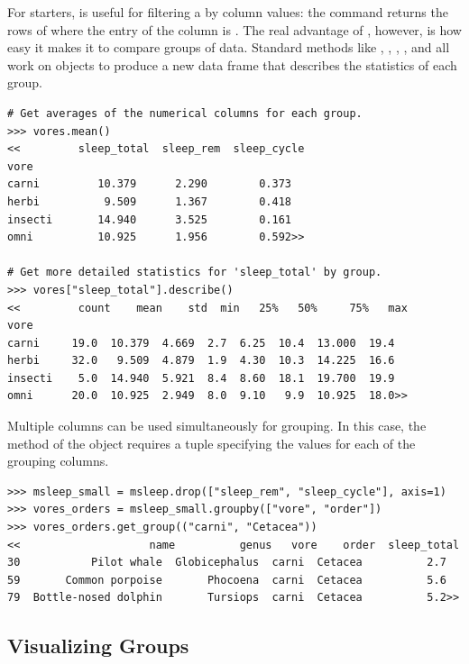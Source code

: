 For starters,  is useful for filtering a  by column values:
the command  returns the rows of  where the entry of the  column is .
The real advantage of , however, is how easy it makes it to compare groups of data.
Standard  methods like , , , , and  all work on  objects to produce a new data frame that describes the statistics of each group.

\begin{lstlisting}
# Get averages of the numerical columns for each group.
>>> vores.mean()
<<         sleep_total  sleep_rem  sleep_cycle
vore
carni         10.379      2.290        0.373
herbi          9.509      1.367        0.418
insecti       14.940      3.525        0.161
omni          10.925      1.956        0.592>>

# Get more detailed statistics for 'sleep_total' by group.
>>> vores["sleep_total"].describe()
<<         count    mean    std  min   25%   50%     75%   max
vore
carni     19.0  10.379  4.669  2.7  6.25  10.4  13.000  19.4
herbi     32.0   9.509  4.879  1.9  4.30  10.3  14.225  16.6
insecti    5.0  14.940  5.921  8.4  8.60  18.1  19.700  19.9
omni      20.0  10.925  2.949  8.0  9.10   9.9  10.925  18.0>>
\end{lstlisting}

Multiple columns can be used simultaneously for grouping.
In this case, the  method of the  object requires a tuple specifying the values for each of the grouping columns.

\begin{lstlisting}
>>> msleep_small = msleep.drop(["sleep_rem", "sleep_cycle"], axis=1)
>>> vores_orders = msleep_small.groupby(["vore", "order"])
>>> vores_orders.get_group(("carni", "Cetacea"))
<<                    name          genus   vore    order  sleep_total
30           Pilot whale  Globicephalus  carni  Cetacea          2.7
59       Common porpoise       Phocoena  carni  Cetacea          5.6
79  Bottle-nosed dolphin       Tursiops  carni  Cetacea          5.2>>
\end{lstlisting}

\subsection*{Visualizing Groups} %

